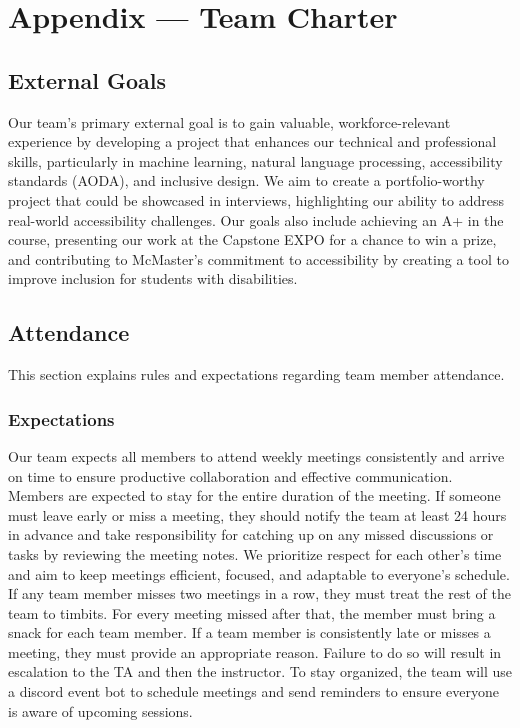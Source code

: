 \documentclass{article}
\begin{document}
\newpage{}

\section*{Appendix --- Team Charter}


\subsection*{External Goals}

Our team’s primary external goal is to gain valuable, workforce-relevant experience by 
developing a project that enhances our technical and professional skills, particularly 
in machine learning, natural language processing, accessibility standards (AODA), and inclusive design. We aim
to create a portfolio-worthy project that could be showcased in interviews, 
highlighting our ability to address real-world accessibility challenges. Our goals also 
include achieving an A+ in the course, presenting our work at the Capstone EXPO for a chance 
to win a prize, and contributing to McMaster's commitment to accessibility by creating a tool to 
improve inclusion for students with disabilities.  

\subsection*{Attendance}
This section explains rules and expectations regarding team member attendance.

\subsubsection*{Expectations}

Our team expects all members to attend weekly meetings consistently and arrive 
on time to ensure productive collaboration and effective communication. Members 
are expected to stay for the entire duration of the meeting. If someone must 
leave early or miss a meeting, they should notify the team at least 24 hours 
in advance and take responsibility for catching up on any missed discussions 
or tasks by reviewing the meeting notes. We prioritize respect for each other’s time and aim to keep meetings efficient, 
focused, and adaptable to everyone’s schedule. If any team member misses two 
meetings in a row, they must treat the rest of the team to timbits. For every 
meeting missed after that, the member must bring a snack for each team member.
If a team member is consistently late or misses a meeting, they must provide an 
appropriate reason. Failure to do so will result in escalation to the TA and 
then the instructor. To stay organized, the team will use a discord event bot to 
schedule meetings and send reminders to ensure everyone is aware of upcoming 
sessions. 
\end{document}
